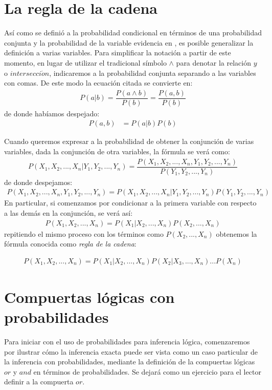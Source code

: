\section{La regla de la cadena}

Así como se definió a la probabilidad condicional en términos de una probabilidad conjunta y la probabilidad de la variable evidencia en , es posible generalizar la definición a varias variables.
Para simplificar la notación a partir de este momento, en lugar de utilizar el tradicional símbolo $\land$ para denotar la relación $y$ o $intersecci\acute{o}n$, indicaremos a la probabilidad conjunta separando a las variables con comas.  De este modo la ecuación citada se convierte en:
\begin{align}
 P(a|b) = \dfrac{P(a \land b)}{P(b)} = \dfrac{P(a, b)}{P(b)}
\end{align}
de donde habíamos despejado:
\begin{align}
 P(a, b) &= P(a|b)P(b)
\end{align}


Cuando queremos expresar a la probabilidad de obtener la conjunción de varias variables, dada la conjunción de otra variables, la fórmula se verá como:
\begin{align}
 P(X_1,X_2,...,X_n|Y_1,Y_2,...,Y_n) = \dfrac{P(X_1,X_2,...,X_n,Y_1,Y_2,...,Y_n)}{P(Y_1,Y_2,...,Y_n)}
\end{align}
de donde despejamos:
\begin{align}
 P(X_1,X_2,...,X_n,Y_1,Y_2,...,Y_n) = P(X_1,X_2,...,X_n|Y_1,Y_2,...,Y_n)P(Y_1,Y_2,...,Y_n)
\end{align}
En particular, si comenzamos por condicionar a la primera variable con respecto a las demás en la conjunción, se verá así:
\begin{align}
 P(X_1,X_2,...,X_n) = P(X_1|X_2,...,X_n)P(X_2,...,X_n)
\end{align}
repitiendo el mismo proceso con los términos como $P(X_2,...,X_n)$ obtenemos la fórmula conocida como \emph{regla de la cadena}:

\begin{align}
 P(X_1,X_2,...,X_n) = P(X_1|X_2,...,X_n)P(X_2|X_3,...,X_n)...P(X_n)
\end{align}


\section{Compuertas lógicas con probabilidades}

Para iniciar con el uso de probabilidades para inferencia lógica, comenzaremos por ilustrar cómo la inferencia exacta puede ser vista como un caso particular de la inferencia con probabilidades, mediante la definición de la compuertas lógicas $or$ y $and$ en términos de probabilidades.  Se dejará como un ejercicio para el lector definir a la compuerta $or$.

